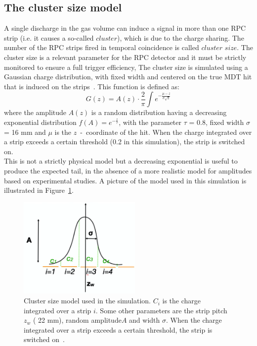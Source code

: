 \subsection{The cluster size model}
\label{sec:CSM}
A single discharge in the gas volume can induce a signal in more than
one RPC strip (i.e. it causes a so-called $cluster$), which is due to the charge sharing.
The number of the RPC strips fired in temporal coincidence is called $cluster$ $size$. 
The cluster size is a relevant parameter for the RPC detector and it must be strictly monitored to 
ensure a full trigger efficiency,
The cluster size is simulated using a Gaussian charge distribution, with fixed width and centered on the true MDT hit that is induced on the strips~\cite{MuonWeek22Oct}. 
This function is defined as:
\begin{equation}
G(z)=A(z)\cdot \frac{2}{\pi} \int{e^{-\frac{\mu-z}{\sigma\sqrt{2}}}}
\end{equation}
where the amplitude $A(z)$ is a random distribution having a decreasing exponential distribution  $f(A)=e^{-\frac{z}{\tau}}$, with the parameter $\tau$ = 0.8, fixed width $\sigma$ = 16 mm and $\mu$ is the $z$~-~coordinate of the hit.
When the charge integrated over a strip exceeds a certain threshold (0.2 in this simulation), the strip is switched on.\\
This is not a strictly physical model but a decreasing exponential is useful to produce the expected tail, in the absence of a more realistic model for amplitudes
based on experimental studies. A picture of the model used in this simulation is illustrated in Figure~\ref{fig:csm_pic}.
\begin{figure}[!h]
	\centering
	\includegraphics[width=0.53\textwidth]{Chapters/CH3/figures/csm_pic}
	\caption{Cluster size model used in the simulation. $C_i$ is the charge integrated over a strip $i$. 
		Some other parameters are the strip pitch $z_w$ ( 22 mm), random amplitude$A$ and width $\sigma$. When the charge integrated over a strip exceeds a certain threshold, the strip is switched on~\cite{MuonWeek22Oct}.}
	\label{fig:csm_pic}
\end{figure}
